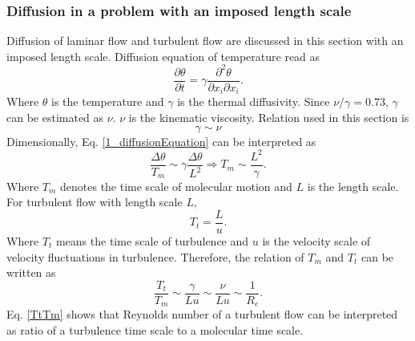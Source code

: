 \documentclass[review]{elsarticle}
\numberwithin{equation}{section}
\begin{document}
		\subsubsection{Diffusion in a problem with an imposed length scale}
			Diffusion of laminar flow and turbulent flow are discussed in this section with an imposed length scale.
			Diffusion equation of temperature read as
			\begin{equation}\label{1_diffusionEquation}
				\frac{\partial \theta}{\partial {t}}=\gamma \frac{\partial ^2\theta}{\partial x_i\partial x_i}.
			\end{equation}
			Where $\theta$ is the temperature and $\gamma$ is the thermal diffusivity. Since $\nu / \gamma = 0.73$, $\gamma$ 
			can be estimated as $\nu$. $\nu$ is the kinematic viscosity.
			Relation used in this section is
			\begin{equation}
				\gamma \sim \nu
			\end{equation}
			Dimensionally, Eq. \ref{1_diffusionEquation} can be interpreted as
			\begin{equation}
				\frac{\Delta \theta}{T_m} \sim \gamma \frac{\Delta \theta}{L^2} \Rightarrow T_m \sim \frac{L^2}{\gamma}.
			\end{equation}
			Where $T_m$ denotes the time scale of molecular motion and $L$ is the length scale.
			For turbulent flow with length scale $L$, 
			\begin{equation}
				T_t = \frac{L}{u}.
			\end{equation}
			Where $T_t$ means the time scale of turbulence and $u$ is the velocity scale of velocity fluctuations in turbulence.
			Therefore, the relation of $T_m$ and $T_t$ can be written as
			\begin{equation}\label{TtTm}
				\frac{T_t}{T_m} \sim \frac{\gamma}{Lu} \sim \frac{\nu}{Lu} \sim \frac{1}{R_e}.
			\end{equation}
			Eq. \ref{TtTm} shows that Reynolds number of a turbulent flow can be interpreted as ratio of a turbulence time scale to 
			a molecular time scale.
			\begin{center}
			\end{center}
\end{document}
